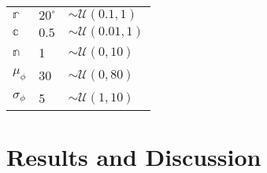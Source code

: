 \documentclass[twocolumn]{aastex631}
\begin{document}
\begin{table}[]
\begin{tabular}{lll}
    $\mathbb{r}$                              & $20^\circ$            & $\sim\mathcal{U}(0.1, 1)$               \\
    $\mathbb{c}$                              & $0.5$                 & $\sim\mathcal{U}(0.01, 1)$              \\
    $\mathbb{n}$                              & 1                     & $\sim\mathcal{U}(0, 10)$                \\
    $\mu_\phi$                                & 30                    & $\sim\mathcal{U}(0, 80)$                \\
    $\sigma_\phi$                             & 5                     & $\sim\mathcal{U}(1, 10)$                 \\ \hline
    \end{tabular}
    \end{table}

\section{Results and Discussion}


\end{document}
